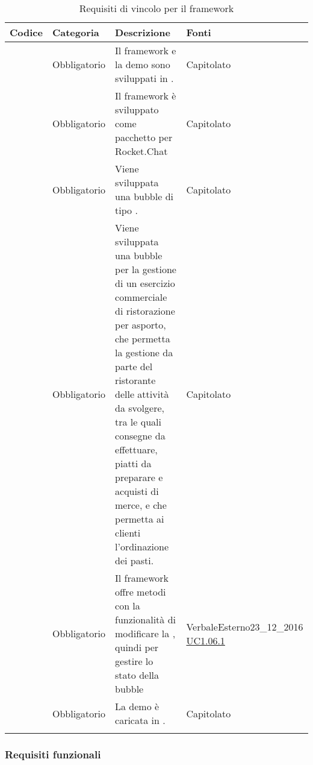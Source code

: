 \begin{longtable}{|P{1.5cm}|P{2.5cm}|P{6.5cm}|P{2.5cm}|}
	\hline \textbf{Codice} & \textbf{Categoria} & \textbf{Descrizione} & \textbf{Fonti} \\
	\hline \RequisitoObV\label{L1} & Obbligatorio & Il framework e la demo sono sviluppati in . & Capitolato \\
	\hline \RequisitoObV \label{L2} & Obbligatorio & Il framework è sviluppato come pacchetto per Rocket.Chat & Capitolato \\
	\hline \RequisitoObV\label{L3} & Obbligatorio & Viene sviluppata una bubble di tipo . & Capitolato \\
	\hline \RequisitoObV\label{L4} & Obbligatorio & Viene sviluppata una bubble per la gestione di un esercizio commerciale di ristorazione per asporto, che permetta la gestione da parte del ristorante delle attività da svolgere, tra le quali consegne da effettuare, piatti da preparare e acquisti di merce, e che permetta ai clienti l'ordinazione dei pasti. & Capitolato \\
	\hline \RequisitoObV\label{L5} & Obbligatorio & Il framework offre metodi con la funzionalità di modificare la , quindi per gestire lo stato della bubble & VerbaleEsterno23\_12\_2016 \linebreak \hyperref[UC1.06.1]{UC1.06.1}  \\
	\hline \RequisitoObV\label{L54} & Obbligatorio & La demo è caricata in . & Capitolato \\
	\hline
	\caption{Requisiti di vincolo per il framework}
\end{longtable}

\subsubsection{Requisiti funzionali}

